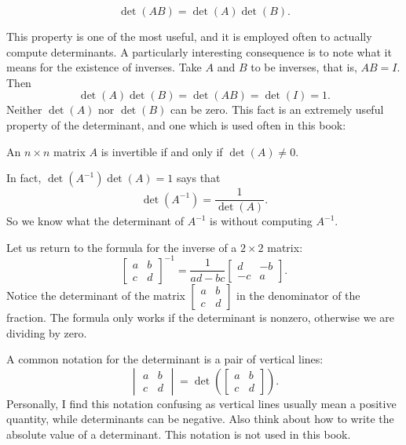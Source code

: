 \begin{theorem}
\begin{equation*}
\det(AB) = \det(A)\det(B) .
\end{equation*}
\end{theorem}

This property is one of the most useful, and it is employed often to 
actually compute determinants.  A particularly interesting consequence is to
note what it means for the existence of inverses.
Take $A$ and $B$ to be inverses, that is, $AB=I$.  Then
\begin{equation*}
\det(A)\det(B) = \det(AB) = \det(I) = 1 .
\end{equation*}
Neither $\det(A)$ nor $\det(B)$ can be zero.
This fact is an extremely useful property of the determinant, and one
which is used often in this book:

\begin{theorem}
An $n \times n$ matrix $A$ is invertible if and only if $\det (A) \not= 0$.
\end{theorem}

In fact, $\det(A^{-1}) \det(A) = 1$ says that
\begin{equation*}
\det(A^{-1}) =
\frac{1}{\det(A)}.
\end{equation*}
So we know what the determinant of $A^{-1}$ is
without computing $A^{-1}$.

Let us return to the formula for the inverse of a $2 \times 2$ matrix:
\begin{equation*}
\begin{bmatrix}
a & b \\
c & d
\end{bmatrix}^{-1}
=
\frac{1}{ad-bc}
\begin{bmatrix}
d & -b \\
-c & a
\end{bmatrix} .
\end{equation*}
Notice the determinant of the matrix
$[\begin{smallmatrix}a&b\\c&d\end{smallmatrix}]$
in the denominator of the fraction.
The formula only works if the determinant is nonzero, otherwise we are
dividing by zero.

%

\medskip


A common notation for the determinant is a pair of vertical
lines:
\begin{equation*}
\begin{vmatrix}
a & b \\
c & d
\end{vmatrix}
=
\det \left(
\begin{bmatrix}
a & b \\
c & d
\end{bmatrix}
\right) .
\end{equation*}
Personally, I find this notation confusing as vertical lines usually
mean a positive quantity, while determinants can be negative.  Also
think about how to write the absolute value of a determinant.
This notation is not used in this book.

